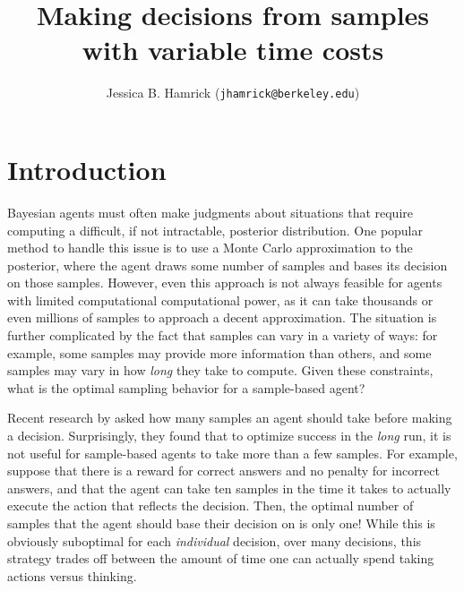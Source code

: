 \documentclass[11pt]{article}
\title{Making decisions from samples with variable time costs}
\author{Jessica B. Hamrick (\texttt{jhamrick@berkeley.edu})}
\date{}
\begin{document}
\maketitle

\section{Introduction}

Bayesian agents must often make judgments about situations that require computing a difficult, if not intractable, posterior distribution. One popular method to handle this issue is to use a Monte Carlo approximation to the posterior, where the agent draws some number of samples and bases its decision on those samples. However, even this approach is not always feasible for agents with limited computational computational power, as it can take thousands or even millions of samples to approach a decent approximation. The situation is further complicated by the fact that samples can vary in a variety of ways: for example, some samples may provide more information than others, and some samples may vary in how \emph{long} they take to compute. Given these constraints, what is the optimal sampling behavior for a sample-based agent?

Recent research by  asked how many samples an agent should take before making a decision. Surprisingly, they found that to optimize success in the \emph{long} run, it is not useful for sample-based agents to take more than a few samples. For example, suppose that there is a reward for correct answers and no penalty for incorrect answers, and that the agent can take ten samples in the time it takes to actually execute the action that reflects the decision. Then, the optimal number of samples that the agent should base their decision on is only one! While this is obviously suboptimal for each \emph{individual} decision, over many decisions, this strategy trades off between the amount of time one can actually spend taking actions versus thinking.
\end{document}

